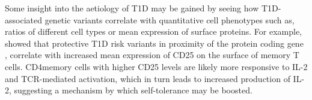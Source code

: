 Some insight into the aetiology of T1D may be gained by seeing how T1D-associated genetic variants correlate with quantitative cell phenotypes such as, ratios of different cell types or mean expression of surface proteins.
For example, \citet{Dendrou:2009dv} showed that protective T1D risk variants in proximity of the protein coding gene , correlate with increased mean expression of CD25 on the surface of memory T cells.
CD4\positive memory cells with higher CD25 levels are likely more responsive to IL-2 and TCR-mediated activation, which in turn leads to increased production of IL-2, suggesting a mechanism by which self-tolerance may be boosted.









